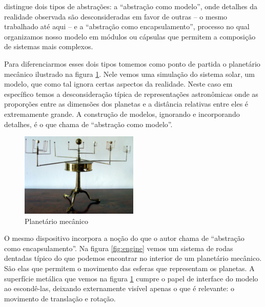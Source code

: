  distingue dois tipos de abstrações: a ``abstração como modelo'', onde detalhes da realidade observada são desconsideradas em favor de outras -- o mesmo trabalhado até aqui -- e a ``abstração como encapsulamento'', processo no qual organizamos nosso modelo em módulos ou cápsulas que permitem a composição de sistemas mais complexos. 



Para diferenciarmos esses dois tipos tomemos como ponto de partida o planetário mecânico ilustrado na figura \ref{fig:planetario}. Nele vemos uma simulação do sistema solar, um modelo, que como tal ignora certas aspectos da realidade. Neste caso em específico temos a desconsideração típica de representações astronômicas onde as proporções entre as dimensões dos planetas e a distância relativas entre eles é extremamente grande. A construção de modelos, ignorando e incorporando detalhes, é o que  chama de ``abstração como modelo''. 

\begin{figure}[htb]
	\caption{Planetário mecânico}\label{fig:planetario}
	\begin{center}
		\includegraphics[width=0.50\textwidth]{imagens/planetario}
	\end{center}
\end{figure}

O mesmo dispositivo incorpora a noção do que o autor chama de ``abstração como encapsulamento''. Na figura \ref{fig:engine} vemos um sistema de rodas dentadas típico do que podemos encontrar no interior de um planetário mecânico. São elas que permitem o movimento das esferas que representam os planetas. A superfície metálica que vemos na figura \ref{fig:planetario} cumpre o papel de interface do modelo ao escondê-las, deixando externamente visível apenas o que é relevante: o movimento de translação e rotação. 

